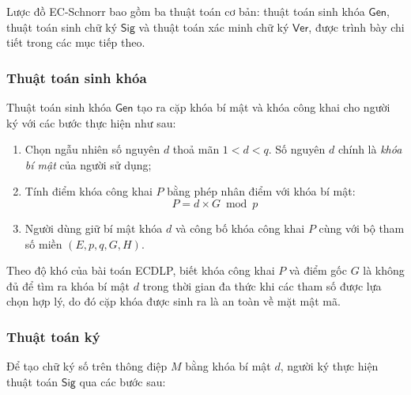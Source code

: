 Lược đồ EC-Schnorr bao gồm ba thuật toán cơ bản: thuật toán sinh khóa $\textsf{Gen}$, thuật toán sinh chữ ký $\textsf{Sig}$ và thuật toán xác minh chữ ký $\textsf{Ver}$, được trình bày chi tiết trong các mục tiếp theo.

\subsubsection{Thuật toán sinh khóa}

Thuật toán sinh khóa $\textsf{Gen}$ tạo ra cặp khóa bí mật và khóa công khai cho người ký với các bước thực hiện như sau:

\begin{enumerate}
    \item Chọn ngẫu nhiên số nguyên $d$ thoả mãn $1 < d < q$. Số nguyên $d$ chính là \textit{khóa bí mật} của người sử dụng;
    \item Tính điểm khóa công khai $P$ bằng phép nhân điểm với khóa bí mật:
    \begin{equation}
        P = d \times G \bmod p
        \label{eq:ec-schnorr-keygen}
    \end{equation}
    \item Người dùng giữ bí mật khóa $d$ và công bố khóa công khai $P$ cùng với bộ tham số miền $(E, p, q, G, H)$.
\end{enumerate}

Theo độ khó của bài toán ECDLP, biết khóa công khai $P$ và điểm gốc $G$ là không đủ để tìm ra khóa bí mật $d$ trong thời gian đa thức khi các tham số được lựa chọn hợp lý, do đó cặp khóa được sinh ra là an toàn về mặt mật mã.

\subsubsection{Thuật toán ký}

Để tạo chữ ký số trên thông điệp $M$ bằng khóa bí mật $d$, người ký thực hiện thuật toán $\textsf{Sig}$ qua các bước sau:

